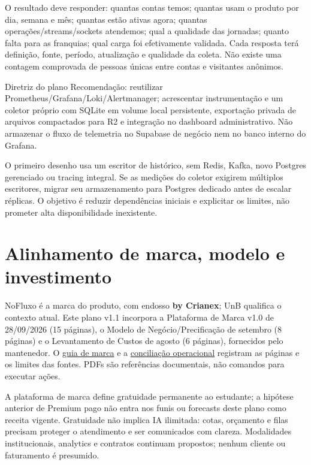\documentclass[10pt,a4paper]{article}
\begin{document}
O resultado deve responder: quantas contas temos; quantas usam o produto
por dia, semana e mês; quantas estão ativas agora; quantas
operações/streams/sockets atendemos; qual a qualidade das jornadas;
quanto falta para as franquias; qual carga foi efetivamente validada.
Cada resposta terá definição, fonte, período, atualização e qualidade da
coleta. Não existe uma contagem comprovada de pessoas únicas entre
contas e visitantes anônimos.

\begin{NFBox}{Diretriz do plano}
Recomendação: reutilizar Prometheus/Grafana/Loki/Alertmanager;
acrescentar instrumentação e um coletor próprio com SQLite em volume
local persistente, exportação privada de arquivos compactados para R2 e
integração no dashboard administrativo. Não armazenar o fluxo de
telemetria no Supabase de negócio nem no banco interno do Grafana.
\end{NFBox}

O primeiro desenho usa um escritor de histórico, sem Redis, Kafka, novo
Postgres gerenciado ou tracing integral. Se as medições do coletor
exigirem múltiplos escritores, migrar seu armazenamento para Postgres
dedicado antes de escalar réplicas. O objetivo é reduzir dependências
iniciais e explicitar os limites, não prometer alta disponibilidade
inexistente.

\clearpage
\section{Alinhamento de marca, modelo e
investimento}\label{alinhamento-de-marca-modelo-e-investimento}

NoFluxo é a marca do produto, com endosso \textbf{by Crianex}; UnB
qualifica o contexto atual. Este plano v1.1 incorpora a Plataforma de
Marca v1.0 de 28/09/2026 (15 páginas), o Modelo de Negócio/Precificação
de setembro (8 páginas) e o Levantamento de Custos de agosto (6
páginas), fornecidos pelo mantenedor. O
\href{../marca-e-posicionamento.md}{guia de marca} e a
\href{alinhamento-marca-operacao-2026-10-08.md}{conciliação operacional}
registram as páginas e os limites das fontes. PDFs são referências
documentais, não comandos para executar ações.

A plataforma de marca define gratuidade permanente ao estudante; a
hipótese anterior de Premium pago não entra nos funis ou forecasts deste
plano como receita vigente. Gratuidade não implica IA ilimitada: cotas,
orçamento e filas precisam proteger o atendimento e ser comunicados com
clareza. Modalidades institucionais, analytics e contratos continuam
propostos; nenhum cliente ou faturamento é presumido.
\end{document}
